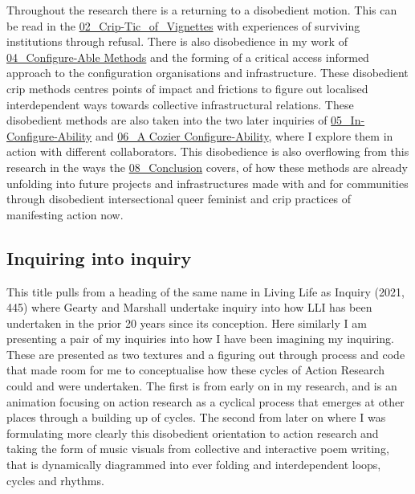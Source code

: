 Throughout the research there is a returning to a disobedient motion.
This can be read in the
\href{../../02_Crip-Tic_of_Vignettes/02_Crip-Tic_of_Vignettes.md}{02\_Crip-Tic\_of\_Vignettes}
with experiences of surviving institutions through refusal. There is
also disobedience in my work of
\href{../../04_Configure-able_Methods/04_Configure-Able\%20Methods.md}{04\_Configure-Able
Methods} and the forming of a critical access informed approach to the
configuration organisations and infrastructure. These disobedient crip
methods centres points of impact and frictions to figure out localised
interdependent ways towards collective infrastructural relations. These
disobedient methods are also taken into the two later inquiries of
\href{../../05_In-Configure-Ability/05_In-Configure-Ability.md}{05\_In-Configure-Ability}
and
\href{../../06_A\%20Cozier\%20Configure-Ability/06_A\%20Cozier\%20Configure-Ability.md}{06\_A
Cozier Configure-Ability}, where I explore them in action with different
collaborators. This disobedience is also overflowing from this research
in the ways the
\href{../../08_Conclusion/08_Conclusion.md}{08\_Conclusion} covers, of
how these methods are already unfolding into future projects and
infrastructures made with and for communities through disobedient
intersectional queer feminist and crip practices of manifesting action
now.

\hypertarget{inquiring-into-inquiry}{%
\subsection[Inquiring into
inquiry]{\texorpdfstring{\protect\hypertarget{anchor}{}{}Inquiring into
inquiry}{Inquiring into inquiry}}\label{inquiring-into-inquiry}}

This title pulls from a heading of the same name in Living Life as
Inquiry (2021, 445) where Gearty and Marshall undertake inquiry into how
LLI has been undertaken in the prior 20 years since its conception. Here
similarly I am presenting a pair of my inquiries into how I have been
imagining my inquiring. These are presented as two textures and a
figuring out through process and code that made room for me to
conceptualise how these cycles of Action Research could and were
undertaken. The first is from early on in my research, and is an
animation focusing on action research as a cyclical process that emerges
at other places through a building up of cycles. The second from later
on where I was formulating more clearly this disobedient orientation to
action research and taking the form of music visuals from collective and
interactive poem writing, that is dynamically diagrammed into ever
folding and interdependent loops, cycles and rhythms.

